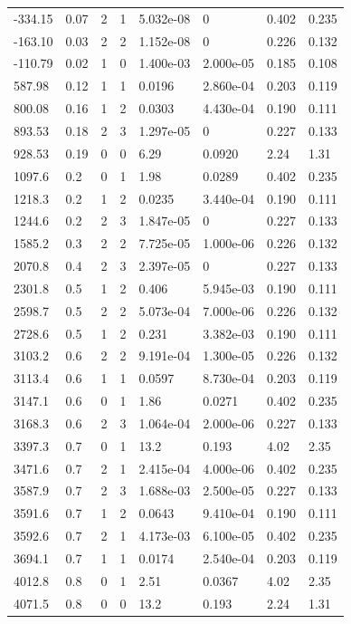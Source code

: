 \documentclass[preview]{standalone}
\begin{document}
{{\begin{tabular}{L{1.2cm}C{1.2cm} C{0.3cm}C{0.5cm} C{1.4cm}C{1.4cm} C{1.4cm}C{1.4cm}}
  -334.15  &  0.07  & 2     &  1 &  5.032e-08  & 0  & 0.402 &  0.235   \\ 
  -163.10  &  0.03  & 2     &  2 &  1.152e-08  & 0  & 0.226 &  0.132   \\ 
  -110.79  &  0.02  & 1     &  0 &  1.400e-03  & 2.000e-05  & 0.185 &  0.108   \\ 
  587.98  &  0.12  & 1     &  1 &  0.0196  & 2.860e-04  & 0.203 &  0.119   \\ 
  800.08  &  0.16  & 1     &  2 &  0.0303  & 4.430e-04  & 0.190 &  0.111   \\ 
  893.53  &  0.18  & 2     &  3 &  1.297e-05  & 0  & 0.227 &  0.133   \\ 
  928.53  &  0.19  & 0     &  0 &  6.29  & 0.0920  & 2.24 &  1.31   \\ 
  1097.6  &   0.2  & 0     &  1 &  1.98  & 0.0289  & 0.402 &  0.235   \\ 
  1218.3  &   0.2  & 1     &  2 &  0.0235  & 3.440e-04  & 0.190 &  0.111   \\ 
  1244.6  &   0.2  & 2     &  3 &  1.847e-05  & 0  & 0.227 &  0.133   \\ 
  1585.2  &   0.3  & 2     &  2 &  7.725e-05  & 1.000e-06  & 0.226 &  0.132   \\ 
  2070.8  &   0.4  & 2     &  3 &  2.397e-05  & 0  & 0.227 &  0.133   \\ 
  2301.8  &   0.5  & 1     &  2 &  0.406  & 5.945e-03  & 0.190 &  0.111   \\ 
  2598.7  &   0.5  & 2     &  2 &  5.073e-04  & 7.000e-06  & 0.226 &  0.132   \\ 
  2728.6  &   0.5  & 1     &  2 &  0.231  & 3.382e-03  & 0.190 &  0.111   \\ 
  3103.2  &   0.6  & 2     &  2 &  9.191e-04  & 1.300e-05  & 0.226 &  0.132   \\ 
  3113.4  &   0.6  & 1     &  1 &  0.0597  & 8.730e-04  & 0.203 &  0.119   \\ 
  3147.1  &   0.6  & 0     &  1 &  1.86  & 0.0271  & 0.402 &  0.235   \\ 
  3168.3  &   0.6  & 2     &  3 &  1.064e-04  & 2.000e-06  & 0.227 &  0.133   \\ 
  3397.3  &   0.7  & 0     &  1 &  13.2  & 0.193  & 4.02 &  2.35   \\ 
  3471.6  &   0.7  & 2     &  1 &  2.415e-04  & 4.000e-06  & 0.402 &  0.235   \\ 
  3587.9  &   0.7  & 2     &  3 &  1.688e-03  & 2.500e-05  & 0.227 &  0.133   \\ 
  3591.6  &   0.7  & 1     &  2 &  0.0643  & 9.410e-04  & 0.190 &  0.111   \\ 
  3592.6  &   0.7  & 2     &  1 &  4.173e-03  & 6.100e-05  & 0.402 &  0.235   \\ 
  3694.1  &   0.7  & 1     &  1 &  0.0174  & 2.540e-04  & 0.203 &  0.119   \\ 
  4012.8  &   0.8  & 0     &  1 &  2.51  & 0.0367  & 4.02 &  2.35   \\ 
  4071.5  &   0.8  & 0     &  0 &  13.2  & 0.193  & 2.24 &  1.31   \\ 
\hline 
\end{tabular} 

}}
\end{document}
